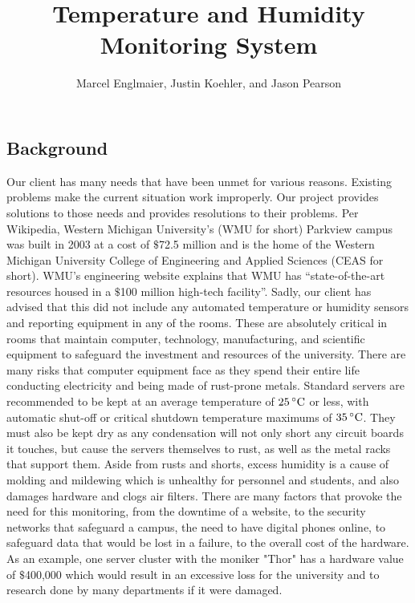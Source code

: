 \documentclass{report}
\begin{document}
\title{Temperature and Humidity Monitoring System}
\author{Marcel Englmaier, Justin Koehler, and Jason Pearson}
\maketitle
\tableofcontents
\newpage

\subsection*{Background}
\indent
Our client has many needs that have been unmet for various reasons. Existing problems make the current situation work improperly. Our project provides solutions to those needs and provides resolutions to their problems.
\newline
\indent
Per Wikipedia, Western Michigan University's (WMU for short) Parkview campus was built in 2003 at a cost of $\$$72.5 million and is the home of the Western Michigan University College of Engineering and Applied Sciences (CEAS for short). WMU’s engineering website explains that WMU has “state-of-the-art resources housed in a $\$$100 million high-tech facility”. Sadly, our client has advised that this did not include any automated temperature or humidity sensors and reporting equipment in any of the rooms. 
These are absolutely critical in rooms that maintain computer, technology, manufacturing, and scientific equipment to safeguard the investment and resources of the university.  There are many risks that computer equipment face as they spend their entire life conducting electricity and being made of rust-prone metals. Standard servers are recommended to be kept at an average temperature of $25\,^{\circ}{\rm C}$ or less, with automatic shut-off or critical shutdown temperature maximums of $35\,^{\circ}{\rm C}$. They must also be kept dry as any condensation will not only short any circuit boards it touches, but cause the servers themselves to rust, as well as the metal racks that support them. Aside from rusts and shorts, excess humidity is a cause of molding and mildewing which is unhealthy for personnel and students, and also damages hardware and clogs air filters.
\newline
\indent
There are many factors that provoke the need for this monitoring, from the downtime of a website, to the security networks that safeguard a campus, the need to have digital phones online, to safeguard data that would be lost in a failure, to the overall cost of the hardware. As an example, one server cluster with the moniker "Thor" has a hardware value of $\$$400,000 which would result in an excessive loss for the university and to research done by many departments if it were damaged.
\end{document}
